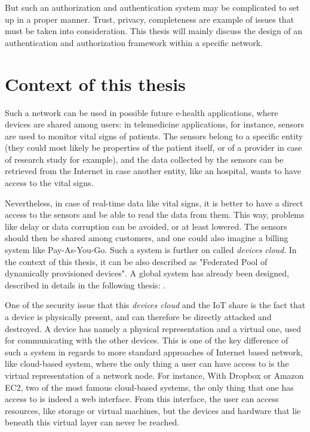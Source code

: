 But such an authorization and authentication system may be complicated to set up in a proper manner. Trust, privacy, completeness are example of issues that must be taken into consideration. This thesis will mainly discuss the design of an authentication and authorization framework within a specific network. 
\\
\section{Context of this thesis}

Such a network can be used in possible future e-health applications, where devices are shared among users: in telemedicine applications, for instance, sensors are used to monitor vital signs of patients. The sensors belong to a specific entity (they could most likely be properties of the patient itself, or of a provider in case of research study for example), and the data collected by the sensors can be retrieved from the Internet in case another entity, like an hospital, wants to have access to the vital signs. 

Nevertheless, in case of real-time data like vital signs, it is better to have a direct access to the sensors and be able to read the data from them. This way, problems like delay or data corruption can be avoided, or at least lowered. The sensors should then be shared among customers, and one could also imagine a billing system like Pay-As-You-Go. Such a system is further on called \emph{devices cloud}. In the context of this thesis, it can be also described as "Federated Pool of dynamically provisioned devices". A global system has already been designed, described in details in the following thesis:  \cite{reference_thesis}.

One of the security issue that this \emph{devices cloud} and the IoT share is the fact that a device is physically present, and can therefore be directly attacked and destroyed. A device has namely a physical representation and a virtual one, used for communicating with the other devices. This is one of the key difference of such a system in regards to more standard approaches of Internet based network, like cloud-based system, where the only thing a user can have access to is the virtual representation of a network node. For instance, With Dropbox or Amazon EC2, two of the most famous cloud-based systems, the only thing that one has access to is indeed a web interface. From this interface, the user can access resources, like storage or virtual machines, but the devices and hardware that lie beneath this virtual layer can never be reached.

